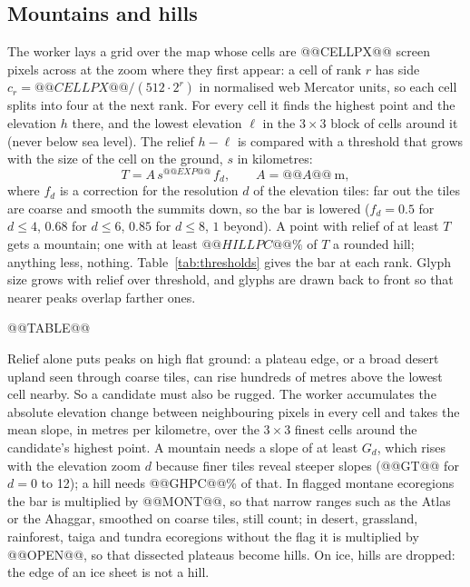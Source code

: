 \documentclass[11pt,a4paper]{article}
\begin{document}
\subsection{Mountains and hills}
The worker lays a grid over the map whose cells are @@CELLPX@@ screen pixels across at the zoom where they first appear: a cell of rank $r$ has side $c_r = @@CELLPX@@/(512 \cdot 2^r)$ in normalised web Mercator units, so each cell splits into four at the next rank. For every cell it finds the highest point and the elevation $h$ there, and the lowest elevation $\ell$ in the $3\times 3$ block of cells around it (never below sea level). The relief $h - \ell$ is compared with a threshold that grows with the size of the cell on the ground, $s$ in kilometres:
\[ T = A \, s^{@@EXP@@} \, f_d, \qquad A = @@A@@~\text{m}, \]
where $f_d$ is a correction for the resolution $d$ of the elevation tiles: far out the tiles are coarse and smooth the summits down, so the bar is lowered ($f_d = 0.5$ for $d \le 4$, $0.68$ for $d \le 6$, $0.85$ for $d \le 8$, $1$ beyond). A point with relief of at least $T$ gets a mountain; one with at least $@@HILLPC@@\%$ of $T$ a rounded hill; anything less, nothing. Table~\ref{tab:thresholds} gives the bar at each rank. Glyph size grows with relief over threshold, and glyphs are drawn back to front so that nearer peaks overlap farther ones.

@@TABLE@@

Relief alone puts peaks on high flat ground: a plateau edge, or a broad desert upland seen through coarse tiles, can rise hundreds of metres above the lowest cell nearby. So a candidate must also be rugged. The worker accumulates the absolute elevation change between neighbouring pixels in every cell and takes the mean slope, in metres per kilometre, over the $3\times3$ finest cells around the candidate's highest point. A mountain needs a slope of at least $G_d$, which rises with the elevation zoom $d$ because finer tiles reveal steeper slopes (@@GT@@ for $d = 0$ to 12); a hill needs @@GHPC@@\% of that. In flagged montane ecoregions the bar is multiplied by @@MONT@@, so that narrow ranges such as the Atlas or the Ahaggar, smoothed on coarse tiles, still count; in desert, grassland, rainforest, taiga and tundra ecoregions without the flag it is multiplied by @@OPEN@@, so that dissected plateaus become hills. On ice, hills are dropped: the edge of an ice sheet is not a hill.
\end{document}
